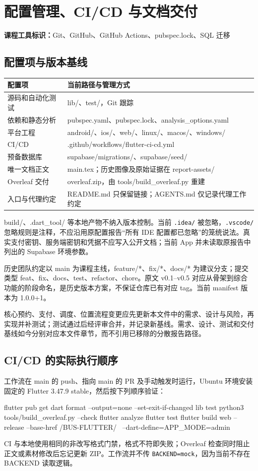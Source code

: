 \documentclass[UTF8,fontset=fandol,zihao=-4,oneside]{ctexrep}
\newcommand{\toolmark}[1]{\par\noindent\textbf{课程工具标识：}#1\par}
\begin{document}
\chapter{配置管理、CI/CD 与文档交付}
\toolmark{Git、GitHub、GitHub Actions、pubspec.lock、SQL 迁移}
\section{配置项与版本基线}
\begin{longtable}{p{4cm}p{10.7cm}}
\toprule 配置项 & 当前路径与管理方式 \\ \midrule
源码和自动化测试 & lib/、test/，Git 跟踪 \\
依赖和静态分析 & pubspec.yaml、pubspec.lock、analysis\_options.yaml \\
平台工程 & android/、ios/、web/、linux/、macos/、windows/ \\
CI/CD & .github/workflows/flutter-ci-cd.yml \\
预备数据库 & supabase/migrations/、supabase/seed/ \\
唯一文档正文 & main.tex；历史图像及原始证据在 report-assets/ \\
Overleaf 交付 & overleaf.zip，由 tools/build\_overleaf.py 重建 \\
入口与代理约定 & README.md 只保留链接；AGENTS.md 仅记录代理工作约定 \\
\bottomrule
\end{longtable}
build/、.dart\_tool/ 等本地产物不纳入版本控制。当前 \texttt{.idea/} 被忽略，\texttt{.vscode/} 忽略规则是注释，不应沿用原配置报告“所有 IDE 配置都已忽略”的笼统说法。真实支付密钥、服务端密钥和凭据不应写入公开文档；当前 App 并未读取原报告中列出的 Supabase 环境参数。

历史团队约定以 main 为课程主线，feature/*、fix/*、docs/* 为建议分支；提交类型 feat、fix、docs、test、refactor、chore。原文 v0.1--v0.5 对应从骨架到综合功能的阶段命名，是历史版本方案，不保证仓库已有对应 tag。当前 manifest 版本为 1.0.0+1。

核心预约、支付、调度、位置流程变更应先更新本文件中的需求、设计与风险，再实现并补测试；测试通过后经评审合并，并记录新基线。需求、设计、测试和交付基线如今分别对应本文件章节，而不引用已移除的分散报告路径。

\section{CI/CD 的实际执行顺序}
工作流在 main 的 push、指向 main 的 PR 及手动触发时运行，Ubuntu 环境安装固定的 Flutter 3.47.9 stable，然后按下列顺序验证：
\begin{code}
flutter pub get
dart format --output=none --set-exit-if-changed lib test
python3 tools/build_overleaf.py --check
flutter analyze
flutter test
flutter build web --release --base-href /BUS-FLUTTER/ \
  --dart-define=APP_MODE=admin
\end{code}
CI 与本地使用相同的非改写格式门禁，格式不符即失败；Overleaf 检查同时阻止正文或素材修改后忘记更新 ZIP。工作流并不传 \texttt{BACKEND=mock}，因为当前不存在 BACKEND 读取逻辑。
\end{document}
